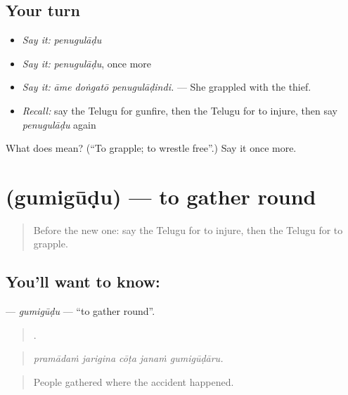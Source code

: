 \subsection*{Your turn}
\begin{itemize}
\raggedright
  \item \emph{Say it:} \emph{penugulāḍu}
  \item \emph{Say it:} \emph{penugulāḍu}, once more
  \item \emph{Say it:} \emph{āme doṅgatō penugulāḍindi.} — She grappled with the thief.
  \item \emph{Recall:} say the Telugu for gunfire, then the Telugu for to injure, then say \emph{penugulāḍu} again
\end{itemize}

\begin{tcolorbox}[breakable,colback=teal!4,colframe=teal!35!black,title={Before you move on}]
What does  mean? (\textquotedblleft{}To grapple; to wrestle free\textquotedblright{}.) Say it once more.
\end{tcolorbox}
\section[\texorpdfstring{\te{గుమిగూడు} (gumigūḍu)}{గుమిగూడు (gumigūḍu)}]{ (gumigūḍu) — to gather round}

\label{lesson:TE-C378-gumigudu}



\begin{quote}
Before the new one: say the Telugu for to injure, then the Telugu for to grapple.
\end{quote}

\subsection*{You'll want to know: }
\textbf{} — \emph{gumigūḍu} — \textquotedblleft{}to gather round\textquotedblright{}.

\begin{quote}
    .
\end{quote}

\begin{quote}
\emph{pramādaṁ jarigina cōṭa janaṁ gumigūḍāru.}
\end{quote}

\begin{quote}
People gathered where the accident happened.
\end{quote}

